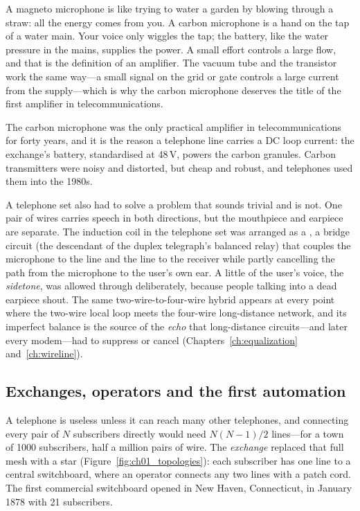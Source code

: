 \begin{analogy}
A magneto microphone is like trying to water a garden by blowing through a straw: all the energy
comes from you. A carbon microphone is a hand on the tap of a water main. Your voice only wiggles the
tap; the battery, like the water pressure in the mains, supplies the power. A small effort controls
a large flow, and that is the definition of an amplifier. The vacuum tube and the transistor work the
same way---a small signal on the grid or gate controls a large current from the supply---which is why
the carbon microphone deserves the title of the first amplifier in telecommunications.
\end{analogy}

The carbon microphone was the only practical amplifier in telecommunications for forty years, and it
is the reason a telephone line carries a DC loop current: the exchange's battery, standardised at
48\,V, powers the carbon granules. Carbon transmitters were noisy and distorted, but cheap and
robust, and telephones used them into the 1980s.

A telephone set also had to solve a problem that sounds trivial and is not. One pair of wires carries
speech in both directions, but the mouthpiece and earpiece are separate. The induction coil in the
telephone set was arranged as a , a bridge circuit (the descendant of the duplex
telegraph's balanced relay) that couples the microphone to the line and the line to the receiver
while partly cancelling the path from the microphone to the user's own ear. A little of the user's
voice, the \emph{sidetone}, was allowed through deliberately, because people talking into a dead
earpiece shout. The same two-wire-to-four-wire hybrid appears at every point where the two-wire local
loop meets the four-wire long-distance network, and its imperfect balance is the source of the
\emph{echo} that long-distance circuits---and later every modem---had to suppress or cancel
(Chapters~\ref{ch:equalization} and~\ref{ch:wireline}).

\subsection{Exchanges, operators and the first automation}

A telephone is useless unless it can reach many other telephones, and connecting every pair of $N$
subscribers directly would need $N(N-1)/2$ lines---for a town of 1000 subscribers, half a million
pairs of wire. The \emph{exchange} replaced that full mesh with a star
(Figure~\ref{fig:ch01_topologies}): each subscriber has one line to a central switchboard, where an
operator connects any two lines with a patch cord. The first commercial switchboard opened in New
Haven, Connecticut, in January 1878 with 21 subscribers.

